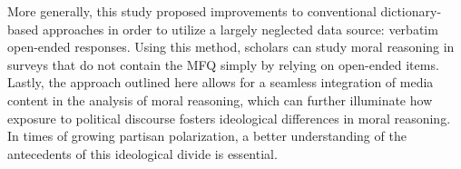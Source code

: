 \documentclass[12pt]{article}
\begin{document}
More generally, this study proposed improvements to conventional dictionary-based approaches in order to utilize a largely neglected data source: verbatim open-ended responses. Using this method, scholars can study moral reasoning in surveys that do not contain the MFQ simply by relying on open-ended items. Lastly, the approach outlined here allows for a seamless integration of media content in the analysis of moral reasoning, which can further illuminate how exposure to political discourse fosters ideological differences in moral reasoning. In times of growing partisan polarization, a better understanding of the antecedents of this ideological divide is essential.







\end{document}
